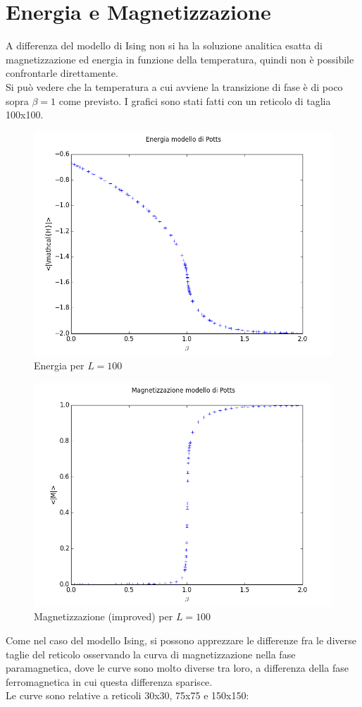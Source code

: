 \section{Energia e Magnetizzazione}
A differenza del modello di Ising non si ha la soluzione analitica esatta di magnetizzazione ed energia in funzione della temperatura, quindi non è possibile confrontarle direttamente.\\
Si può vedere che la temperatura a cui avviene la transizione di fase è di poco sopra $\beta=1$ come previsto. I grafici sono stati fatti con un reticolo di taglia 100x100.
\begin{figure}[h!]
	\centering
	\includegraphics[scale=0.55]{potts/en100.png}
	\caption{Energia per $L=100$}
\end{figure}
\begin{figure}[h!]
	\centering
	\includegraphics[scale=0.55]{potts/mag100.png}
	\caption{Magnetizzazione (improved) per $L=100$}
\end{figure}
Come nel caso del modello Ising, si possono apprezzare le differenze fra le diverse taglie del reticolo osservando la curva di magnetizzazione nella fase paramagnetica, dove le curve sono molto diverse tra loro, a differenza della fase ferromagnetica in cui questa differenza sparisce.\\
Le curve sono relative a reticoli 30x30, 75x75 e 150x150:

